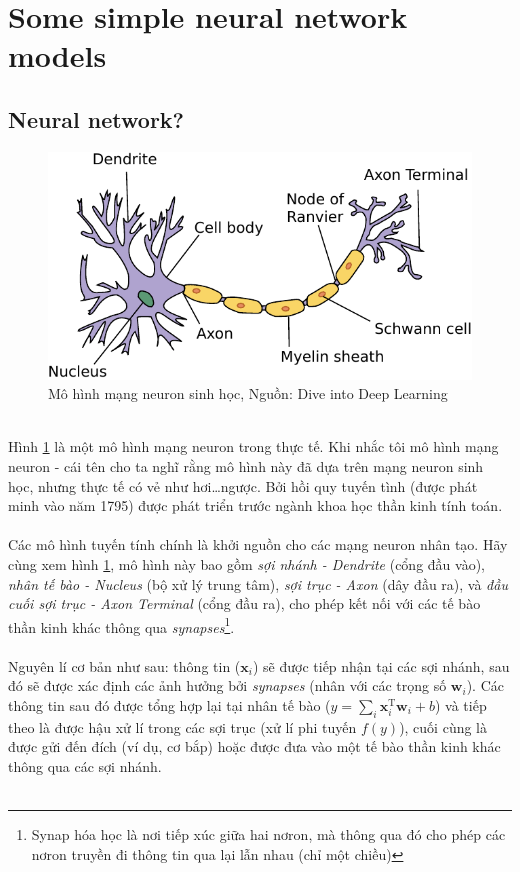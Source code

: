 \documentclass{article}
\begin{document}
\section{Some simple neural network models}
\subsection{Neural network?}
\begin{figure}[ht!]
    \centering
    \includegraphics[width = 0.7\linewidth]{neuron.pdf}
    \caption{Mô hình mạng neuron sinh học, Nguồn: Dive into Deep Learning}
    \label{fig4}
\end{figure}
\phantom{a}\\
Hình \ref{fig4} là một mô hình mạng neuron trong thực tế. Khi nhắc tôi mô hình mạng neuron - cái tên cho ta nghĩ rằng mô hình này đã dựa trên mạng neuron sinh học, nhưng thực tế có vẻ như hơi\ldots ngược. Bởi hồi quy tuyến tình (được phát minh vào năm 1795) được phát triển trước ngành khoa học thần kinh tính toán.\\\\
Các mô hình tuyến tính chính là khởi nguồn cho các mạng neuron nhân tạo. Hãy cùng xem hình \ref{fig4}, mô hình này bao gồm \textit{sợi nhánh - Dendrite} (cổng đầu vào), \textit{nhân tế bào - Nucleus} (bộ xử lý trung tâm), \textit{sợi trục - Axon} (dây đầu ra), và \textit{đầu cuối sợi trục - Axon Terminal} (cổng đầu ra), cho phép kết nối với các tế bào thần kinh khác thông qua \textit{synapses}\footnote{Synap hóa học là nơi tiếp xúc giữa hai nơron, mà thông qua đó cho phép các nơron truyền đi thông tin qua lại lẫn nhau (chỉ một chiều)}.\\\\
Nguyên lí cơ bản như sau: thông tin ($\textbf{x}_i$) sẽ được tiếp nhận tại các sợi nhánh, sau đó sẽ được xác định các ảnh hưởng bởi \textit{synapses} (nhân với các trọng số $\textbf{w}_i$). Các thông tin  sau đó được tổng hợp lại tại nhân tế bào ($y = \sum_{i}\textbf{x}_{i}^{\text{T}}\textbf{w}_i + b$) và tiếp theo là được hậu xử lí trong các sợi trục (xử lí phi tuyến $f(y)$), cuối cùng là được gửi đến đích (ví dụ, cơ bắp) hoặc được đưa vào một tế bào thần kinh khác thông qua các sợi nhánh.\\\\ \label{n1}
\end{document}
